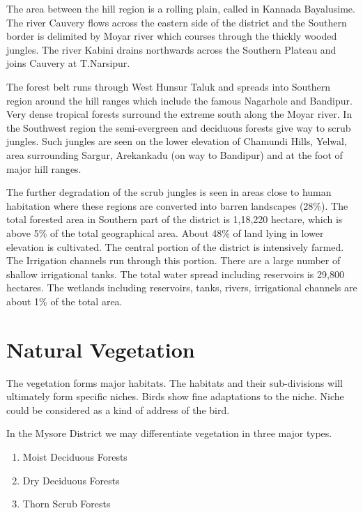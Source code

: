 The area between the hill region is a rolling plain, called 
in Kannada Bayalusime. The river Cauvery flows across the eastern 
side of the district and the Southern border is delimited by 
Moyar river which courses through the thickly wooded jungles. The 
river Kabini drains northwards across the Southern Plateau and 
joins Cauvery at T.Narsipur. 

The forest belt runs through West Hunsur Taluk and spreads 
into Southern region around the hill ranges which include the 
famous Nagarhole and Bandipur. Very dense tropical forests surround 
the extreme south along the Moyar river. In the Southwest 
region the semi-evergreen and deciduous forests give way to 
scrub jungles. Such jungles are seen on the lower elevation of 
Chamundi Hills, Yelwal, area surrounding Sargur, Arekankadu (on 
way to Bandipur) and at the foot of major hill ranges. 

The further degradation of the scrub jungles is seen in 
areas close to human habitation where these regions are converted 
into barren landscapes (28\%). The total forested area in Southern 
part of the district is 1,18,220 hectare, which is above 5\% of 
the total geographical area. About 48\% of land lying in lower 
elevation is cultivated. The central portion of the district is 
intensively farmed. The Irrigation channels run through this 
portion. There are a large number of shallow irrigational tanks. 
The total water spread including reservoirs is 29,800 hectares. 
The wetlands including reservoirs, tanks, rivers, irrigational 
channels are about 1\% of the total area. 

\chapter{Natural Vegetation}

The vegetation forms major habitats. The habitats and their 
sub-divisions will ultimately form specific niches. Birds show 
fine adaptations to the niche. Niche could be considered as a 
kind of address of the bird. 

In the Mysore District we may differentiate vegetation in 
three major types. 
\begin{enumerate}
\itemsep=2pt
\item Moist Deciduous Forests 

\item Dry Deciduous Forests 

\item Thorn Scrub Forests 
\end{enumerate} 

